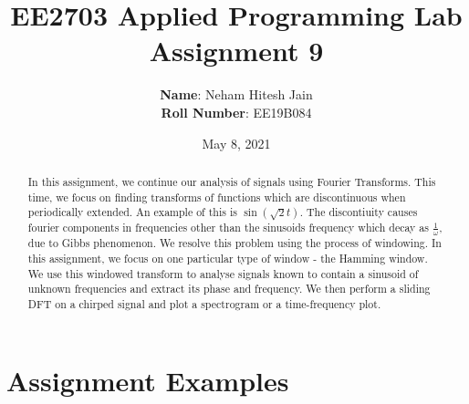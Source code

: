 \documentclass{article}
\title{EE2703 Applied Programming Lab \\   Assignment 9}
\author{
  \textbf{Name}: Neham Hitesh Jain\\
  \textbf{Roll Number}: EE19B084
}\date{May 8, 2021}
\begin{document}
\maketitle
\newpage

\begin{abstract}

    In this assignment, we continue our analysis of signals using Fourier
    Transforms. This time, we focus on finding transforms of functions which
    are discontinuous when periodically extended. An example of this is
    \(\sin(\sqrt{2} t)\). The discontiuity causes fourier components in
    frequencies other than the sinusoids frequency which decay as
    \(\frac{1}{\omega}\), due to Gibbs phenomenon. We resolve this problem
    using the process of windowing. In this assignment, we focus on one
    particular type of window - the Hamming window. We use this windowed
    transform to analyse signals known to contain a sinusoid of unknown
    frequencies and extract its phase and frequency. We then perform a
    sliding DFT on a chirped signal and plot a spectrogram or a
    time-frequency plot.    

\end{abstract}

\section{Assignment Examples}
\end{document}
